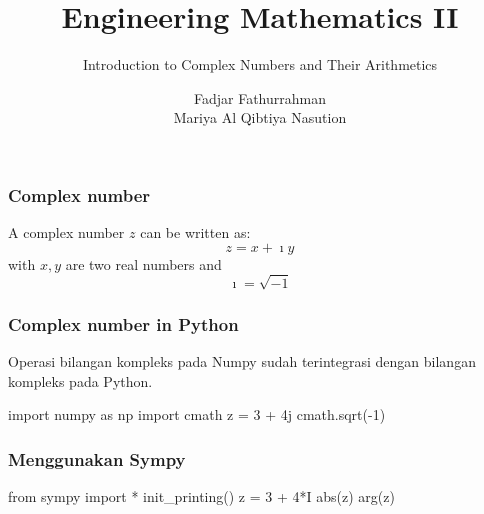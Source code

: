 



\title{Engineering Mathematics II}
\subtitle{Introduction to Complex Numbers and Their Arithmetics}
\author{Fadjar Fathurrahman\\
Mariya Al Qibtiya Nasution}
\date{}

\frame{\titlepage}

\begin{frame}
\frametitle{Complex number}

A complex number $z$ can be written as:
$$
z = x + \imath y
$$
with $x,y$ are two real numbers and
$$
\imath = \sqrt{-1}
$$

\end{frame}




\begin{frame}[fragile]
\frametitle{Complex number in Python}

Operasi bilangan kompleks pada Numpy sudah terintegrasi dengan bilangan
kompleks pada Python.

\begin{pythoncode}
import numpy as np
import cmath
z = 3 + 4j
cmath.sqrt(-1)
\end{pythoncode}

\end{frame}


\begin{frame}[fragile]
\frametitle{Menggunakan Sympy}
  
\begin{pythoncode}
from sympy import *
init_printing()
z = 3 + 4*I
abs(z)
arg(z)
\end{pythoncode}

\end{frame}




